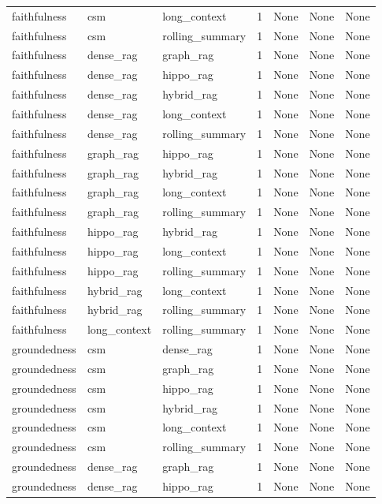 \begin{tabular}{lllllll}
faithfulness & csm & long\_context & 1 & None & None & None \\
faithfulness & csm & rolling\_summary & 1 & None & None & None \\
faithfulness & dense\_rag & graph\_rag & 1 & None & None & None \\
faithfulness & dense\_rag & hippo\_rag & 1 & None & None & None \\
faithfulness & dense\_rag & hybrid\_rag & 1 & None & None & None \\
faithfulness & dense\_rag & long\_context & 1 & None & None & None \\
faithfulness & dense\_rag & rolling\_summary & 1 & None & None & None \\
faithfulness & graph\_rag & hippo\_rag & 1 & None & None & None \\
faithfulness & graph\_rag & hybrid\_rag & 1 & None & None & None \\
faithfulness & graph\_rag & long\_context & 1 & None & None & None \\
faithfulness & graph\_rag & rolling\_summary & 1 & None & None & None \\
faithfulness & hippo\_rag & hybrid\_rag & 1 & None & None & None \\
faithfulness & hippo\_rag & long\_context & 1 & None & None & None \\
faithfulness & hippo\_rag & rolling\_summary & 1 & None & None & None \\
faithfulness & hybrid\_rag & long\_context & 1 & None & None & None \\
faithfulness & hybrid\_rag & rolling\_summary & 1 & None & None & None \\
faithfulness & long\_context & rolling\_summary & 1 & None & None & None \\
groundedness & csm & dense\_rag & 1 & None & None & None \\
groundedness & csm & graph\_rag & 1 & None & None & None \\
groundedness & csm & hippo\_rag & 1 & None & None & None \\
groundedness & csm & hybrid\_rag & 1 & None & None & None \\
groundedness & csm & long\_context & 1 & None & None & None \\
groundedness & csm & rolling\_summary & 1 & None & None & None \\
groundedness & dense\_rag & graph\_rag & 1 & None & None & None \\
groundedness & dense\_rag & hippo\_rag & 1 & None & None & None \\

\end{tabular}

